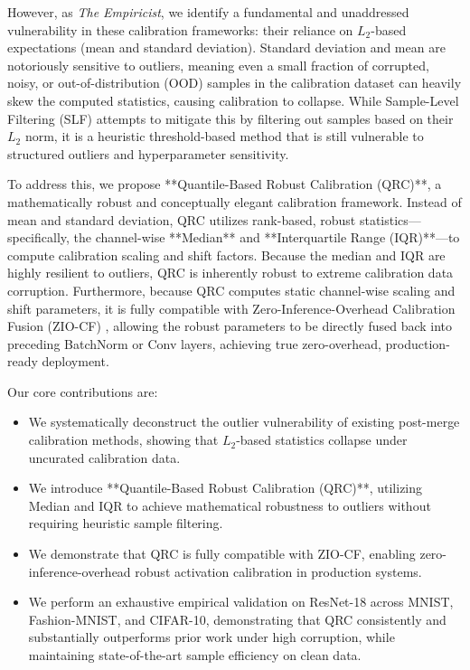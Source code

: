 \documentclass{article}
\theoremstyle{plain}
\theoremstyle{definition}
\theoremstyle{remark}
\begin{document}
However, as \textit{The Empiricist}, we identify a fundamental and unaddressed vulnerability in these calibration frameworks: their reliance on $L_2$-based expectations (mean and standard deviation). Standard deviation and mean are notoriously sensitive to outliers, meaning even a small fraction of corrupted, noisy, or out-of-distribution (OOD) samples in the calibration dataset can heavily skew the computed statistics, causing calibration to collapse. While Sample-Level Filtering (SLF) \cite{ziocf2026} attempts to mitigate this by filtering out samples based on their $L_2$ norm, it is a heuristic threshold-based method that is still vulnerable to structured outliers and hyperparameter sensitivity.

To address this, we propose **Quantile-Based Robust Calibration (QRC)**, a mathematically robust and conceptually elegant calibration framework. Instead of mean and standard deviation, QRC utilizes rank-based, robust statistics---specifically, the channel-wise **Median** and **Interquartile Range (IQR)**---to compute calibration scaling and shift factors. Because the median and IQR are highly resilient to outliers, QRC is inherently robust to extreme calibration data corruption. Furthermore, because QRC computes static channel-wise scaling and shift parameters, it is fully compatible with Zero-Inference-Overhead Calibration Fusion (ZIO-CF) \cite{ziocf2026}, allowing the robust parameters to be directly fused back into preceding BatchNorm or Conv layers, achieving true zero-overhead, production-ready deployment.

Our core contributions are:
\begin{itemize}
  \item We systematically deconstruct the outlier vulnerability of existing post-merge calibration methods, showing that $L_2$-based statistics collapse under uncurated calibration data.
  \item We introduce **Quantile-Based Robust Calibration (QRC)**, utilizing Median and IQR to achieve mathematical robustness to outliers without requiring heuristic sample filtering.
  \item We demonstrate that QRC is fully compatible with ZIO-CF, enabling zero-inference-overhead robust activation calibration in production systems.
  \item We perform an exhaustive empirical validation on ResNet-18 across MNIST, Fashion-MNIST, and CIFAR-10, demonstrating that QRC consistently and substantially outperforms prior work under high corruption, while maintaining state-of-the-art sample efficiency on clean data.
\end{itemize}
\end{document}
